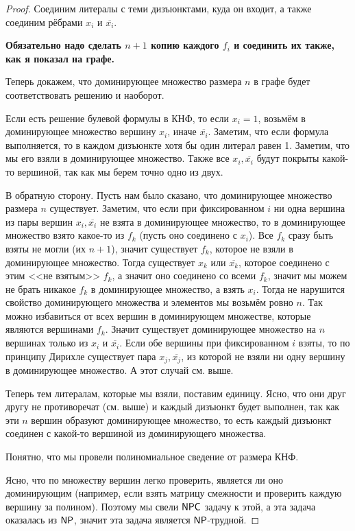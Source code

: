 \documentclass[a4paper, 12pt]{article}
\begin{document}
\begin{proof}
  Соединим литералы с теми дизъюнктами, куда он входит, а также соединим
  рёбрами $x_i$ и $\overline{x_i}$.

  \textbf{Обязательно надо сделать $n + 1$ копию каждого $f_i$ и соединить их
  также, как я показал на графе.}

  Теперь докажем, что доминирующее множество размера $n$ в графе будет
  соответствовать решению и наоборот.

  Если есть решение булевой формулы в КНФ, то если $x_i = 1$, возьмём в
  доминирующее множество вершину $x_i$, иначе $\overline{x_i}$. Заметим, что
  если формула выполняется, то в каждом дизъюнкте хотя бы один литерал равен 1.
  Заметим, что мы его взяли в доминирующее множество. Также все $x_i, \overline{x_i}$
  будут покрыты какой-то вершиной, так как мы берем точно одно из двух.

  В обратную сторону. Пусть нам было сказано, что доминирующее множество размера
  $n$ существует. Заметим, что если при фиксированном $i$ ни одна вершина из 
  пары вершин $x_i, \overline{x_i}$ не взята в доминирующее множество, то в
  доминирующее множество взято какое-то из $f_k$ (пусть оно соединено с $x_i$). Все $f_k$ сразу быть взяты
  не могли (их $n + 1$), значит существует $f_k$, которое не взяли в доминирующее
  множество. Тогда существует $x_k$ или $\overline{x_k}$, которое соединено
  с этим <<не взятым>> $f_k$, а значит оно соединено со всеми $f_k$, значит мы
  можем не брать никакое $f_k$ в доминирующее множество, а взять $x_i$. Тогда
  не нарушится свойство доминирующего множества и элементов мы возьмём ровно $n$.
  Так можно избавиться от всех вершин в доминирующем множестве, которые являются
  вершинами $f_k$. Значит существует доминирующее множество на $n$ вершинах только
  из $x_i$ и $\overline{x_i}$. Если обе вершины при фиксированном $i$ взяты,
  то по принципу Дирихле существует пара $x_j, \overline{x_j}$, из которой
  не взяли ни одну вершину в доминирующее множество. А этот случай см. выше.

  Теперь тем литералам, которые мы взяли, поставим единицу. Ясно, что они
  друг другу не противоречат (см. выше) и каждый дизъюнкт будет выполнен, так
  как эти $n$ вершин образуют доминирующее множество, то есть каждый дизъюнкт
  соединен с какой-то вершиной из доминирующего множества.

  Понятно, что мы провели полиномиальное сведение от размера КНФ.

  Ясно, что по множеству вершин легко проверить, является ли оно доминирующим
  (например, если взять матрицу смежности и проверить каждую вершину за полином).
  Поэтому мы свели $\mathsf{NPC}$ задачу к этой, а эта задача оказалась из $\mathsf{NP}$,
  значит эта задача является $\mathsf{NP}$-трудной.
\end{proof}
\end{document}
